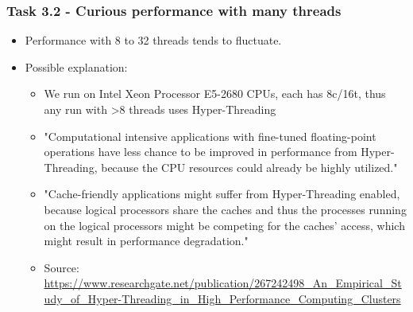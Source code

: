 \begin{frame}
\frametitle{Task 3.2 - Curious performance with many threads}
\begin{itemize}
\item Performance with 8 to 32 threads tends to fluctuate. 
\item Possible explanation: \begin{itemize}
\item We run on Intel Xeon Processor E5-2680 CPUs, each has 8c/16t, thus any run with \textgreater 8 threads uses Hyper-Threading
\item "Computational intensive applications with fine-tuned floating-point operations have less chance to be improved in performance from Hyper-Threading, because the CPU resources could already be highly utilized."
\item "Cache-friendly applications might suffer from Hyper-Threading enabled, because logical processors share the caches and thus the processes running on the logical processors might be competing for the caches' access, which might result in performance degradation."
\item Source: \url{https://www.researchgate.net/publication/267242498_An_Empirical_Study_of_Hyper-Threading_in_High_Performance_Computing_Clusters}
\end{itemize} 
\end{itemize}
\end{frame}